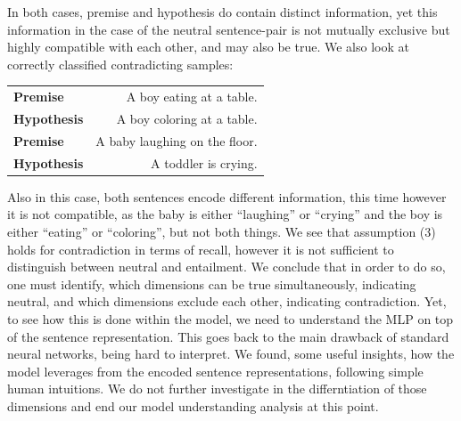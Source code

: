 In both cases, premise and hypothesis do contain distinct information, yet this information in the case of the neutral sentence-pair is not mutually exclusive but highly compatible with each other, and may also be true. We also look at correctly classified contradicting samples:
\begin{center}
\begin{tabular}{lr}
\textbf{Premise} & A boy eating at a table. \\
\textbf{Hypothesis} & A boy coloring at a table. \\
\midrule
\textbf{Premise} & A baby laughing on the floor. \\
\textbf{Hypothesis} & A toddler is crying.
\end{tabular}
\end{center}
Also in this case, both sentences encode different information, this time however it is not compatible, as the baby is either ``laughing'' or ``crying'' and the boy is either ``eating'' or ``coloring'', but not both things. We see that assumption (3) holds for contradiction in terms of recall, however it is not sufficient to distinguish between neutral and entailment. We conclude that in order to do so, one must identify, which dimensions can be true simultaneously, indicating neutral, and which dimensions exclude each other, indicating contradiction. Yet, to see how this is done within the model, we need to understand the \ac{MLP} on top of the sentence representation. This goes back to the main drawback of standard neural networks, being hard to interpret. We found, some useful insights, how the model leverages from the encoded sentence representations, following simple human intuitions. We do not further investigate in the differntiation of those dimensions and end our model understanding analysis at this point.

